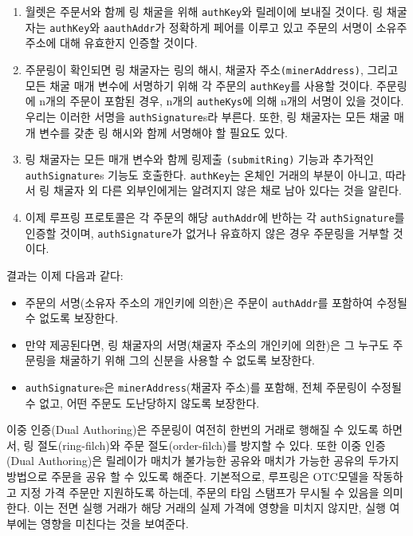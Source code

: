 \documentclass{article}
\begin{document}
\begin{multicols}{2}
\begin{enumerate}
      \item 월렛은 주문서와 함께 링 채굴을 위해 \verb|authKey|와 릴레이에 보내질 것이다. 링 채굴자는 \verb|authKey|와 \verb|aauthAddr|가 정확하게 페어를 이루고 있고 주문의 서명이 소유주 주소에 대해 유효한지 인증할 것이다. 
      
      \item 주문링이 확인되면 링 채굴자는 링의 해시, 채굴자 주소\verb|(minerAddress)|, 그리고 모든 채굴 매개 변수에 서명하기 위해 각 주문의 \verb|authKey|를 사용할 것이다. 주문링에 n개의 주문이 포함된 경우, n개의 \verb|autheKys|에 의해 n개의 서명이 있을 것이다. 우리는 이러한 서명을 \verb|authSignature|s라 부른다. 또한, 링 채굴자는 모든 채굴 매개 변수를 갖춘 링 해시와 함께 서명해야 할 필요도 있다. 
      
      \item 링 채굴자는 모든 매개 변수와 함께 링제출 \verb|(submitRing)| 기능과 추가적인 \verb|authSignature|s 기능도 호출한다. \verb|authKey|는 온체인 거래의 부분이 아니고, 따라서 링 채굴자 외 다른 외부인에게는 알려지지 않은 채로 남아 있다는 것을 알린다.
     
      \item 이제 루프링 프로토콜은 각 주문의 해당 \verb|authAddr|에 반하는 각 \verb|authSignature|를 인증할 것이며, \verb|authSignature|가 없거나 유효하지 않은 경우 주문링을 거부할 것이다. 
      
\end{enumerate}

결과는 이제 다음과 같다:

\begin{itemize}

      \item  주문의 서명(소유자 주소의 개인키에 의한)은 주문이 \verb|authAddr|를 포함하여 수정될 수 없도록 보장한다. 
      
      \item  만약 제공된다면, 링 채굴자의 서명(채굴자 주소의 개인키에 의한)은 그 누구도 주문링을 채굴하기 위해 그의 신분을 사용할 수 없도록 보장한다.
      
      \item \verb|authSignature|s은 \verb|minerAddress|(채굴자 주소)를 포함해, 전체 주문링이 수정될 수 없고, 어떤 주문도 도난당하지 않도록 보장한다. 
\end{itemize}

이중 인증(Dual Authoring)은 주문링이 여전히 한번의 거래로 행해질 수 있도록 하면서, 링 절도(ring-filch)와 주문 절도(order-filch)를 방지할 수 있다. 또한 이중 인증(Dual Authoring)은 릴레이가 매치가 불가능한 공유와 매치가 가능한 공유의 두가지 방법으로 주문을 공유 할 수 있도록 해준다.  
기본적으로, 루프링은 OTC모델을 작동하고 지정 가격 주문만 지원하도록 하는데, 주문의 타임 스탬프가 무시될 수 있음을 의미한다. 이는 전면 실행 거래가 해당 거래의 실제 가격에 영향을 미치지 않지만, 실행 여부에는 영향을 미친다는 것을 보여준다.




\end{multicols}
\end{document}
